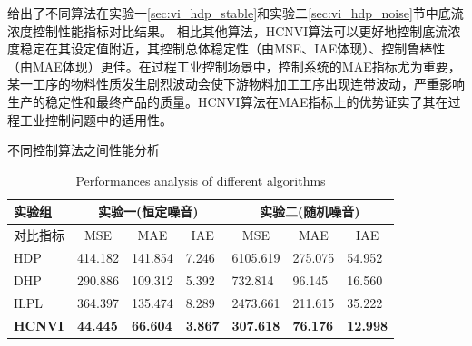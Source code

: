 给出了不同算法在实验一\ref{sec:vi_hdp_stable}和实验二\ref{sec:vi_hdp_noise}节中底流浓度控制性能指标对比结果。
相比其他算法，HCNVI算法可以更好地控制底流浓度稳定在其设定值附近，其控制总体稳定性（由MSE、IAE体现）、控制鲁棒性（由MAE体现）更佳。在过程工业控制场景中，控制系统的MAE指标尤为重要，某一工序的物料性质发生剧烈波动会使下游物料加工工序出现连带波动，严重影响生产的稳定性和最终产品的质量。HCNVI算法在MAE指标上的优势证实了其在过程工业控制问题中的适用性。


\begin{table}[htbp]

\caption{不同控制算法之间性能分析}
    \addtocounter{table}{-1}
    \vspace{-0.2cm}
    \renewcommand{\tablename}{Table}
    \caption{Performances analysis of different algorithms}
    \renewcommand{\tablename}{表}
    \vspace{0.4cm}
\begin{tabular}{l|lll|lll}
\toprule
实验组 & \multicolumn{3}{c|}{实验一(恒定噪音)} & \multicolumn{3}{c|}{实验二(随机噪音)} \\
\hline 对比指标 & \multicolumn{1}{c}{MSE\footnotemark[1]} &
\multicolumn{1}{c}{MAE\footnotemark[2]} &
\multicolumn{1}{c|}{IAE\footnotemark[3]} & \multicolumn{1}{c}{MSE} &
\multicolumn{1}{c}{MAE} & \multicolumn{1}{c|}{IAE} \\ \hline
HDP & 414.182& 141.854 & 7.246 & 6105.619 & 275.075 & 54.952 \\
DHP & 290.886 & 109.312 & 5.392 & 732.814 & 96.145 & 16.560 \\
ILPL & 364.397 & 135.474 & 8.289 & 2473.661 &211.615 & 35.222 \\
\textbf{HCNVI} & \textbf{44.445} & \textbf{66.604} & \textbf{3.867} & \textbf{307.618} & \textbf{76.176} & \textbf{12.998} \\
\bottomrule
\end{tabular}%
\label{tab:MSE_cmp} \centering
\end{table}

  


